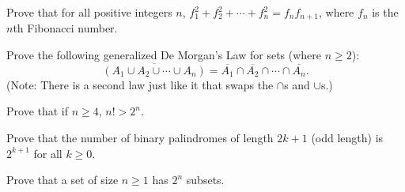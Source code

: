 


\begin{pro}
Prove that for all positive integers $n$, $f_1^2 + f_2^2 + \cdots +f_n^2 = f_nf_{n+1}$,  
where $f_n$ is the $n$th Fibonacci number.
\end{pro}



\begin{pro}
Prove the following generalized De Morgan's Law for sets (where $n\geq 2$):
$$\overline{(A_1\cup A_2\cup\cdots \cup A_n)} = \overline{A_1}\cap \overline{A_2}\cap\cdots\cap \overline{A_n}.$$
(Note: There is a second law just like it that swaps the $\cap$s and $\cup$s.)
\end{pro}

\begin{pro}
Prove that if $n\geq 4$, $n!> 2^n$.
\end{pro}

\begin{pro}
Prove that the number of binary palindromes of length $2k+1$ (odd length) is 
$2^{k+1}$ for all $k\geq 0$.
\end{pro}

\begin{pro}
Prove that a set of size $n\geq 1$ has $2^n$ subsets.
\end{pro}



